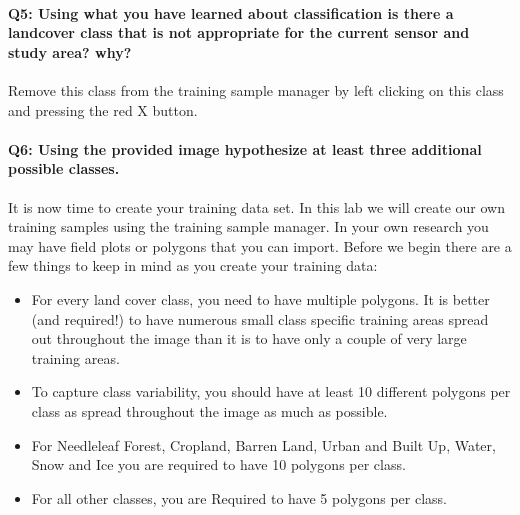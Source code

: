 \documentclass[
]{book}
\providecommand{\tightlist}{%
  \setlength{\itemsep}{0pt}\setlength{\parskip}{0pt}}
\begin{document}
\hypertarget{q5-using-what-you-have-learned-about-classification-is-there-a-landcover-class-that-is-not-appropriate-for-the-current-sensor-and-study-area-why}{%
\paragraph*{Q5: Using what you have learned about classification is there a landcover class that is not appropriate for the current sensor and study area? why?}\label{q5-using-what-you-have-learned-about-classification-is-there-a-landcover-class-that-is-not-appropriate-for-the-current-sensor-and-study-area-why}}

Remove this class from the training sample manager by left clicking on this class and pressing the red X button.

\hypertarget{q6-using-the-provided-image-hypothesize-at-least-three-additional-possible-classes.}{%
\paragraph*{Q6: Using the provided image hypothesize at least three additional possible classes.}\label{q6-using-the-provided-image-hypothesize-at-least-three-additional-possible-classes.}}

It is now time to create your training data set. In this lab we will create our own training samples using the training sample manager. In your own research you may have field plots or polygons that you can import. Before we begin there are a few things to keep in mind as you create your training data:

\begin{itemize}
\tightlist
\item
  For every land cover class, you need to have multiple polygons. It is better (and required!) to have numerous small class specific training areas spread out throughout the image than it is to have only a couple of very large training areas.
\item
  To capture class variability, you should have at least 10 different polygons per class as spread throughout the image as much as possible.
\item
  For Needleleaf Forest, Cropland, Barren Land, Urban and Built Up, Water, Snow and Ice you are required to have 10 polygons per class.
\item
  For all other classes, you are Required to have 5 polygons per class.
\end{itemize}
\end{document}
